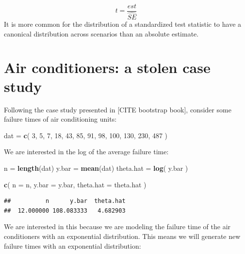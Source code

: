 \documentclass[
]{book}
\newenvironment{Shaded}{\begin{snugshade}}{\end{snugshade}}
\newcommand{\AttributeTok}[1]{\textcolor[rgb]{0.13,0.29,0.53}{#1}}
\newcommand{\DecValTok}[1]{\textcolor[rgb]{0.00,0.00,0.81}{#1}}
\newcommand{\FunctionTok}[1]{\textcolor[rgb]{0.13,0.29,0.53}{\textbf{#1}}}
\newcommand{\NormalTok}[1]{#1}
\newcommand{\OtherTok}[1]{\textcolor[rgb]{0.56,0.35,0.01}{#1}}
\begin{document}
\[ t = \frac{est}{\widehat{SE}} \]
It is more common for the distribution of a standardized test statistic to have a canonical distribution across scenarios than an absolute estimate.

\section{Air conditioners: a stolen case study}\label{air-conditioners-a-stolen-case-study}

Following the case study presented in {[}CITE bootstrap book{]}, consider some failure times of air conditioning units:

\begin{Shaded}
\begin{Highlighting}[]
\NormalTok{dat }\OtherTok{=} \FunctionTok{c}\NormalTok{( }\DecValTok{3}\NormalTok{, }\DecValTok{5}\NormalTok{, }\DecValTok{7}\NormalTok{, }\DecValTok{18}\NormalTok{, }\DecValTok{43}\NormalTok{, }\DecValTok{85}\NormalTok{, }\DecValTok{91}\NormalTok{, }\DecValTok{98}\NormalTok{, }\DecValTok{100}\NormalTok{, }\DecValTok{130}\NormalTok{, }\DecValTok{230}\NormalTok{, }\DecValTok{487}\NormalTok{ )}
\end{Highlighting}
\end{Shaded}

We are interested in the log of the average failure time:

\begin{Shaded}
\begin{Highlighting}[]
\NormalTok{n }\OtherTok{=} \FunctionTok{length}\NormalTok{(dat)}
\NormalTok{y.bar }\OtherTok{=} \FunctionTok{mean}\NormalTok{(dat)}
\NormalTok{theta.hat }\OtherTok{=} \FunctionTok{log}\NormalTok{( y.bar )}

\FunctionTok{c}\NormalTok{( }\AttributeTok{n =}\NormalTok{ n, }\AttributeTok{y.bar =}\NormalTok{ y.bar, }\AttributeTok{theta.hat =}\NormalTok{ theta.hat )}
\end{Highlighting}
\end{Shaded}

\begin{verbatim}
##          n      y.bar  theta.hat 
##  12.000000 108.083333   4.682903
\end{verbatim}

We are interested in this because we are modeling the failure time of the air conditioners with an exponential distribution.
This means we will generate new failure times with an exponential distribution:
\end{document}
